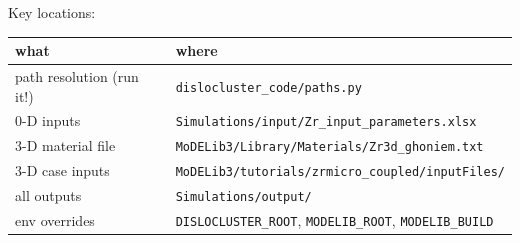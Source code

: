 \documentclass[11pt]{article}
\newcommand{\code}[1]{\texttt{\small #1}}
\newcommand{\file}[1]{\texttt{\footnotesize #1}}
\begin{document}
\noindent Key locations:

\begin{table}[htbp]
\centering
\begin{tabular}{@{}ll@{}}
\toprule
what & where \\
\midrule
path resolution (run it!) & \file{dislocluster\_code/paths.py} \\
0-D inputs & \file{Simulations/input/Zr\_input\_parameters.xlsx} \\
3-D material file & \file{MoDELib3/Library/Materials/Zr3d\_ghoniem.txt} \\
3-D case inputs & \file{MoDELib3/tutorials/zrmicro\_coupled/inputFiles/} \\
all outputs & \file{Simulations/output/} \\
env overrides & \code{DISLOCLUSTER\_ROOT}, \code{MODELIB\_ROOT}, \code{MODELIB\_BUILD} \\
\bottomrule
\end{tabular}
\end{table}
\end{document}
